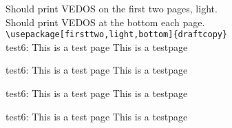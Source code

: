 \documentclass[a4paper,finnish]{article}
\newcommand{\xx}{
test6: This is a test page \thepage \vfill
This is a testpage \thepage \newpage
}
\begin{document}
Should print VEDOS on the first two pages, light.\\
Should print VEDOS at the bottom each page.\\
\verb|\usepackage[firsttwo,light,bottom]{draftcopy}|\\
\xx\xx\xx\xx
\end{document}
